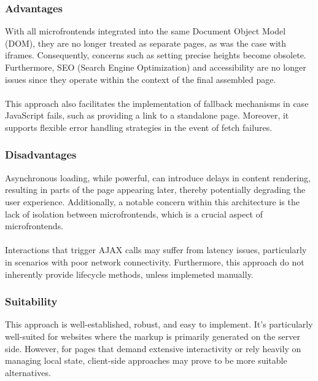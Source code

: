\subsubsection{Advantages}
With all microfrontends integrated into the same Document Object Model (DOM), they are no longer treated as separate pages, as was the case with iframes. Consequently, concerns such as setting precise heights become obsolete. Furthermore, SEO (Search Engine Optimization) and accessibility are no longer issues since they operate within the context of the final assembled page. \\\\
This approach also facilitates the implementation of fallback mechanisms in case JavaScript fails, such as providing a link to a standalone page. Moreover, it supports flexible error handling strategies in the event of fetch failures. \cite{MFInAction}

\subsubsection{Disadvantages}
Asynchronous loading, while powerful, can introduce delays in content rendering, resulting in parts of the page appearing later, thereby potentially degrading the user experience. Additionally, a notable concern within this architecture is the lack of isolation between microfrontends, which is a crucial aspect of microfrontends. \\\\
Interactions that trigger AJAX calls may suffer from latency issues, particularly in scenarios with poor network connectivity. Furthermore, this approach do not inherently provide lifecycle methods, unless implemeted manually. \cite{MFInAction}

\subsubsection{Suitability}
This approach is well-established, robust, and easy to implement. It's particularly well-suited for websites where the markup is primarily generated on the server side. However, for pages that demand extensive interactivity or rely heavily on managing local state, client-side approaches may prove to be more suitable alternatives.

